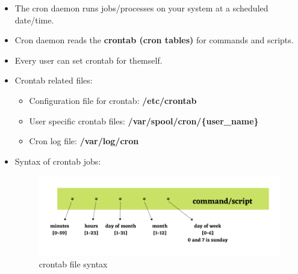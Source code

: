 \setlength{\columnsep}{3pt}
\begin{flushleft}
	\bigskip
	\begin{itemize}
		\item The cron daemon runs jobs/processes on your system at a scheduled date/time.
		\item Cron daemon reads the \textbf{crontab (cron tables)} for commands and scripts.
		\item Every user can set crontab for themself.
		\item Crontab related files:
 
		\begin{itemize}
			\item Configuration file for crontab: \textbf{/etc/crontab}
			\item User specific crontab files: \textbf{/var/spool/cron/\{user\_name\}}
			\item Cron log file: \textbf{/var/log/cron}
		\end{itemize}
		
		\item Syntax of crontab jobs:
		
		\begin{figure}[h!]
			\centering
			\includegraphics[scale=0.5]{content/chapter13/images/cronjob.png}
			
			\caption{crontab file syntax}
			\label{fig:cronjob}
		\end{figure}
	\end{itemize}
	
	
\end{flushleft}

\newpage





